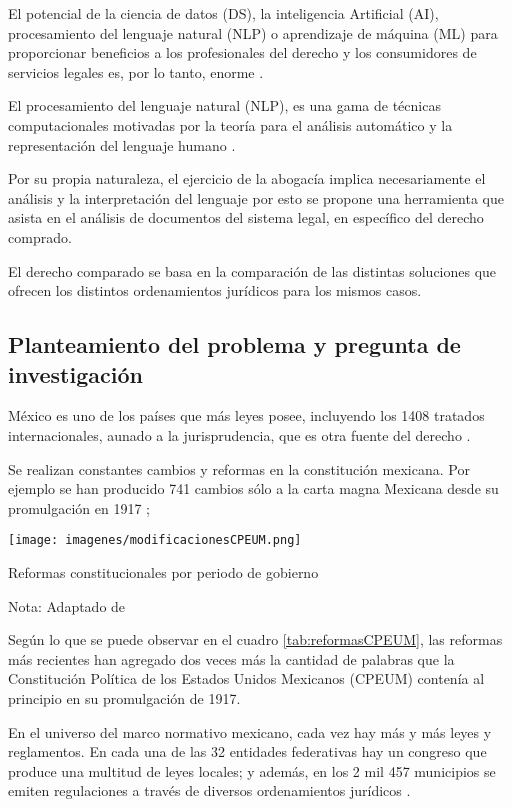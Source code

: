 \documentclass[12pt]{article}
\begin{document}
		El potencial de la ciencia de datos (DS), la inteligencia Artificial (AI), procesamiento del lenguaje natural (NLP) o aprendizaje de máquina (ML) para proporcionar beneficios a los profesionales del derecho y los consumidores de servicios legales es, por lo tanto, enorme \cite{Aletras2020}.
	
		El procesamiento del lenguaje natural (NLP),  es una gama de técnicas computacionales motivadas por la teoría para el análisis automático y la representación del lenguaje humano \cite{Cambria2014}. 	
		
		Por su propia naturaleza, el ejercicio de la abogacía implica necesariamente el análisis y la interpretación del lenguaje \cite{Romero-Perez2014} por esto se propone una herramienta que asista en el análisis de documentos del sistema legal, en específico del derecho comprado.

		El derecho comparado se basa en la comparación de las distintas soluciones que ofrecen los distintos ordenamientos jurídicos para los mismos casos.\cite{Somma2006}
		
		
		
		\subsection{Planteamiento del problema y pregunta de investigación}
		México es uno de los países que más leyes posee, incluyendo los 1408 tratados internacionales, aunado a la jurisprudencia, que es otra fuente del derecho \cite{GUERRA2016}.
		
		Se realizan constantes cambios y reformas en la constitución mexicana. Por ejemplo se han producido 741 cambios sólo a la carta magna Mexicana desde su promulgación en 1917 \cite{CAMACHO2020};
		
		\begin{table}[H]
			\texttt{[image: imagenes/modificacionesCPEUM.png]}
			\centering
			\caption{Reformas constitucionales por periodo de gobierno}
			\caption*{\small  Nota: Adaptado de \cite{Fix-Fierro2017}}
			\label{tab:reformasCPEUM}
		\end{table}
		
		Según lo que se puede observar en el cuadro \ref{tab:reformasCPEUM}, las reformas más recientes han agregado dos veces más la cantidad de palabras que la Constitución Política de los Estados Unidos Mexicanos (CPEUM) contenía al principio en su promulgación de 1917.\cite{Fix-Fierro2017}
		
		En el universo del marco normativo mexicano, cada vez hay más y más leyes y reglamentos. En cada una de las 32 entidades federativas hay un congreso que produce una multitud de leyes locales; y además, en los 2 mil 457 municipios se emiten regulaciones a través de diversos ordenamientos jurídicos \cite{BUSTAMANTE2019}.
		
\end{document}
